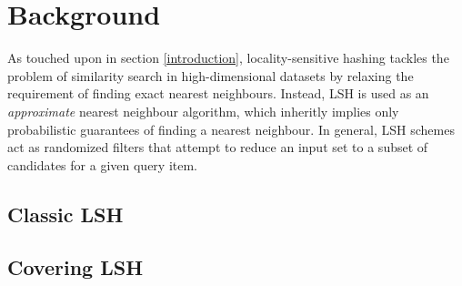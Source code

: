 \section{Background}
\label{background}

As touched upon in section \ref{introduction}, locality-sensitive hashing tackles the problem of similarity search in high-dimensional datasets by relaxing the requirement of finding exact nearest neighbours. Instead, LSH is used as an \textit{approximate} nearest neighbour algorithm, which inheritly implies only probabilistic guarantees of finding a nearest neighbour. In general, LSH schemes act as randomized filters that attempt to reduce an input set to a subset of candidates for a given query item.

\subsection{Classic LSH}
\label{background-classic-lsh}

\subsection{Covering LSH}
\label{background-covering-lsh}

